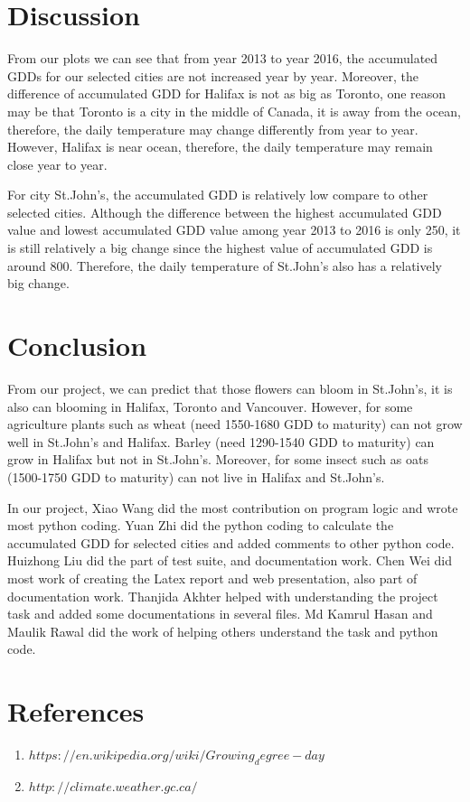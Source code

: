 \documentclass[12pt]{article}
\begin{document}
\section{ \bf Discussion}
From our plots we can see that from year 2013 to year 2016, the accumulated GDDs for our selected cities are not increased year by year. Moreover, the difference of accumulated GDD for Halifax is not as big as Toronto, one reason may be that Toronto is a city in the middle of Canada, it is away from the ocean, therefore, the daily temperature may change differently from year to year. However, Halifax is near ocean, therefore, the daily temperature may remain close year to year. 

For city St.John's, the accumulated GDD is relatively low compare to other selected cities. Although the difference between the highest accumulated GDD value and lowest accumulated GDD value among year 2013 to 2016 is only 250, it is still relatively a big change since the highest value of accumulated GDD is around 800. Therefore, the daily temperature of St.John's also has a relatively big change.


\section{Conclusion}
From our project, we can predict that those flowers can bloom in St.John's, it is also can blooming in Halifax, Toronto and Vancouver. However, for some agriculture plants such as wheat (need 1550-1680 GDD to maturity) can not grow well in St.John's and Halifax. Barley (need 1290-1540 GDD to maturity) can grow in Halifax but not in St.John's. Moreover, for some insect such as oats (1500-1750 GDD to maturity) can not live in Halifax and St.John's.

In our project, Xiao Wang did the most contribution on program logic and wrote most python coding. Yuan Zhi did the python coding to calculate the accumulated GDD for selected cities and added comments to other python code. Huizhong Liu did the part of test suite, and documentation work. Chen Wei did most work of creating the Latex report and web presentation, also part of documentation work. Thanjida Akhter helped with understanding the project task and added some documentations in several files. Md Kamrul Hasan and Maulik Rawal did the work of helping others understand the task and python code.


\section{References}

\begin{enumerate}
\item \href{url}{$https://en.wikipedia.org/wiki/Growing_degree-day$}
\item \href{url}{$http://climate.weather.gc.ca/$}
\end{enumerate}
\end{document}
